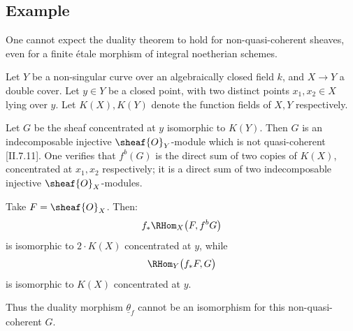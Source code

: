 \subsection{Example}
One cannot expect the duality theorem to hold for non-quasi-coherent sheaves, even for a finite étale morphism of integral noetherian schemes.

Let \(Y\) be a non-singular curve over an algebraically closed field \(k\), and \(X\to Y\) a double cover. Let \(y\in Y\) be a closed point, with two distinct points \(x_1,x_2\in X\) lying over \(y\). Let \(K(X),K(Y)\) denote the function fields of \(X,Y\) respectively.

Let \(G\) be the sheaf concentrated at \(y\) isomorphic to \(K(Y)\). Then \(G\) is an indecomposable injective \(\sheaf{O}_Y\)-module which is not quasi-coherent [II.7.11]. One verifies that \(f^b(G)\) is the direct sum of two copies of \(K(X)\), concentrated at \(x_1,x_2\) respectively; it is a direct sum of two indecomposable injective \(\sheaf{O}_X\)-modules.

\setcounter{page}{172}
Take \(F=\sheaf{O}_X\). Then:
\[
f_*\RHom_X\bigl(F,f^b G\bigr)
\]
is isomorphic to \(2\cdot K(X)\) concentrated at \(y\), while
\[
\RHom_Y\bigl(f_*F,G\bigr)
\]
is isomorphic to \(K(X)\) concentrated at \(y\).

Thus the duality morphism \(\underline{\theta}_f\) cannot be an isomorphism for this non-quasi-coherent \(G\).

